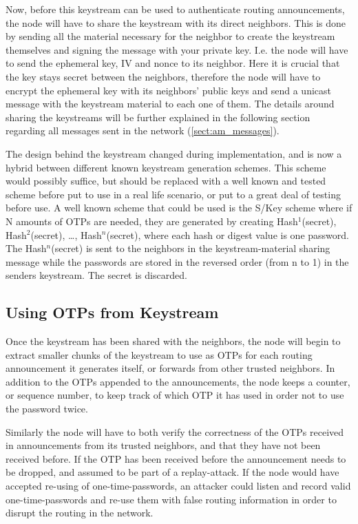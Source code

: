 Now, before this keystream can be used to authenticate routing announcements,
the node will have to share the keystream with its direct neighbors. This is
done by sending all the material necessary for the neighbor to create the
keystream themselves and signing the message with your private key. I.e. the
node will have to send the ephemeral key, \ac{IV} and nonce to its neighbor.
Here it is crucial that the key stays secret between the neighbors, therefore
the node will have to encrypt the ephemeral key with its neighbors' public keys
and send a unicast message with the keystream material to each one of them. The
details around sharing the keystreams will be further explained in the
following section regarding all messages sent in the network
(\ref{sect:am_messages}).

The design behind the keystream changed during implementation, and is now a
hybrid between different known keystream generation schemes. This scheme would
possibly suffice, but should be replaced with a well known and tested scheme
before put to use in a real life scenario, or put to a great deal of testing
before use. A well known scheme that could be used is the S/Key scheme
\cite{haller1994s} where if N amounts of \acp{OTP} are needed, they are
generated by creating Hash$^1$(secret), Hash$^2$(secret), \ldots,
Hash$^n$(secret), where each hash or digest value is one password. The
Hash$^n$(secret) is sent to the neighbors in the keystream-material sharing
message while the passwords are stored in the reversed order (from n to 1) in
the senders keystream. The secret is discarded.

\subsection{Using \aclp{OTP} from Keystream}
Once the keystream has been shared with the neighbors, the node will begin to
extract smaller chunks of the keystream to use as \acp{OTP} for each
routing announcement it generates itself, or forwards from other trusted
neighbors. In addition to the \acp{OTP} appended to the announcements,
the node keeps a counter, or sequence number, to keep track of which
\ac{OTP} it has used in order not to use the password twice.

Similarly the node will have to both verify the correctness of the \acp{OTP}
received in announcements from its trusted neighbors, and that they have not
been received before. If the OTP has been received before the announcement
needs to be dropped, and assumed to be part of a replay-attack. If the node
would have accepted re-using of one-time-passwords, an attacker could listen
and record valid one-time-passwords and re-use them with false routing
information in order to disrupt the routing in the network.

